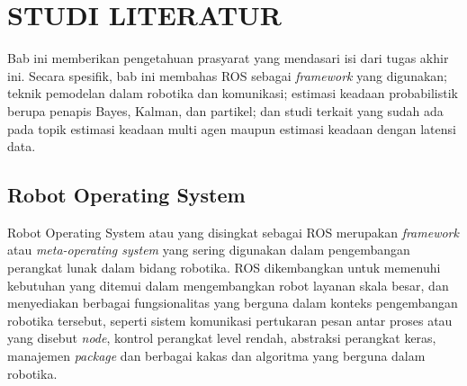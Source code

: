 \chapter{STUDI LITERATUR}

Bab ini memberikan pengetahuan prasyarat yang mendasari isi dari tugas akhir ini. Secara spesifik, bab ini membahas ROS sebagai \textit{framework} yang digunakan; teknik pemodelan dalam robotika dan komunikasi; estimasi keadaan probabilistik berupa penapis Bayes, Kalman, dan partikel; dan studi terkait yang sudah ada pada topik estimasi keadaan multi agen maupun estimasi keadaan dengan latensi data.

\section{Robot Operating System}

Robot Operating System atau yang disingkat sebagai ROS merupakan \textit{framework} atau \textit{meta-operating system} yang sering digunakan dalam pengembangan perangkat lunak dalam bidang robotika. ROS dikembangkan untuk memenuhi kebutuhan yang ditemui dalam mengembangkan robot layanan skala besar, dan menyediakan berbagai fungsionalitas yang berguna dalam konteks pengembangan robotika tersebut, seperti sistem komunikasi pertukaran pesan antar proses atau yang disebut \textit{node}, kontrol perangkat level rendah, abstraksi perangkat keras, manajemen \textit{package} dan berbagai kakas dan algoritma yang berguna dalam robotika.

